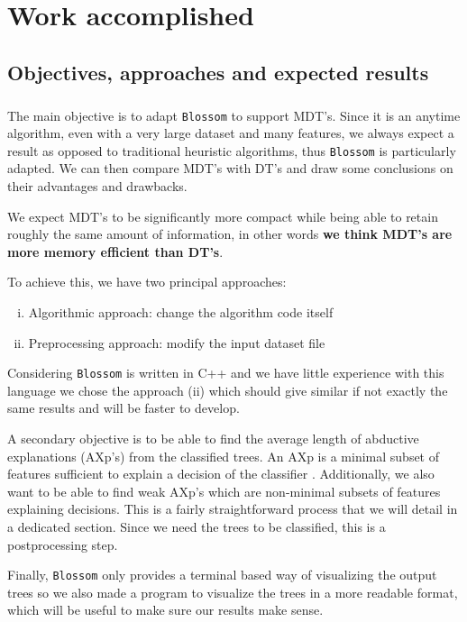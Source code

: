 \documentclass[12pt]{report}
\theoremstyle{definition}
\theoremstyle{definition}
\theoremstyle{definition}
\begin{document}
\chapter{Work accomplished}
\section{Objectives, approaches and expected results}
\paragraph{} The main objective is to adapt \texttt{Blossom} to support MDT's. Since it is an anytime algorithm, even with a very large dataset and many features, we always expect a result as opposed to traditional heuristic algorithms, thus \texttt{Blossom} is particularly adapted. We can then compare MDT's with DT's and draw some conclusions on their advantages and drawbacks.

We expect MDT's to be significantly more compact while being able to retain roughly the same amount of information, in other words \textbf{we think MDT's are more memory efficient than DT's}.

To achieve this, we have two principal approaches:

\begin{enumerate}[(i)]
    \item Algorithmic approach: change the algorithm code itself
    \item Preprocessing approach: modify the input dataset file
\end{enumerate}

Considering \texttt{Blossom} is written in C++ and we have little experience with this language we chose the approach (ii) which should give similar if not exactly the same results and will be faster to develop.

A secondary objective is to be able to find the average length of abductive explanations (AXp's) from the classified trees. An AXp is a minimal subset of features sufficient to explain a decision of the classifier \cite{multivariate-explaining}. Additionally, we also want to be able to find weak AXp's which are non-minimal subsets of features explaining decisions. This is a fairly straightforward process that we will detail in a dedicated section. Since we need the trees to be classified, this is a postprocessing step.

Finally, \texttt{Blossom} only provides a terminal based way of visualizing the output trees so we also made a program to visualize the trees in a more readable format, which will be useful to make sure our results make sense.
\end{document}
